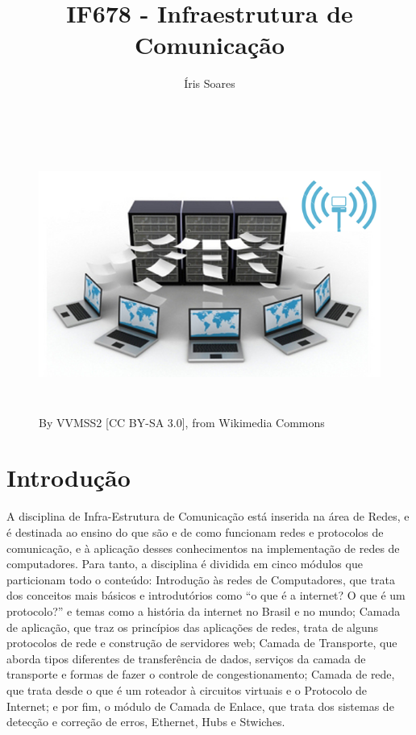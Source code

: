 \documentclass[10pt, a4paper]{article}
\title{IF678 - Infraestrutura de Comunicação}
\author{Íris Soares}
\begin{document}
\maketitle

\begin{figure} [h]
\centering
\includegraphics[height=9cm]{iss3.png}
\caption{By VVMSS2 [CC BY-SA 3.0], from Wikimedia Commons}
\end{figure}

\section{Introdução}

A disciplina de Infra-Estrutura de Comunicação está inserida na área de Redes, e é destinada ao ensino do que são e de como funcionam redes e protocolos de comunicação, e à aplicação desses conhecimentos na implementação de redes de computadores. Para tanto, a disciplina é dividida em cinco módulos que particionam todo o conteúdo: Introdução às redes de Computadores, que trata dos conceitos mais básicos e introdutórios como “o que é a internet? O que é um protocolo?” e temas como a história da internet no Brasil e no mundo; Camada de aplicação, que traz os princípios das aplicações de redes, trata de alguns protocolos de rede e construção de servidores web; Camada de Transporte, que aborda tipos diferentes de transferência de dados, serviços da camada de transporte e formas de fazer o controle de congestionamento; Camada de rede, que trata desde o que é um roteador à circuitos virtuais e o Protocolo de Internet; e por fim, o módulo de Camada de Enlace, que trata dos sistemas de detecção e correção de erros, Ethernet, Hubs e Stwiches.\cite{at}
\end{document}
